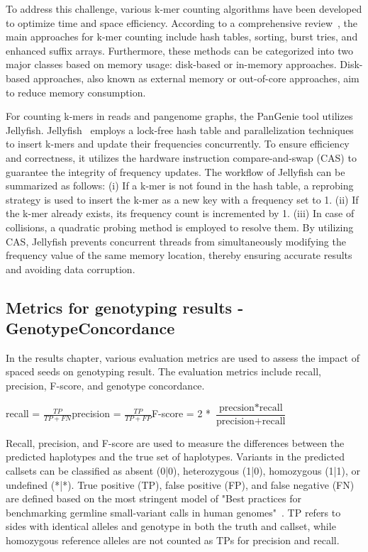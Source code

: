 \documentclass{PHlab-thesis}
\begin{document}
To address this challenge, various k-mer counting algorithms have been developed to optimize time and space efficiency. According to a comprehensive review~\cite{Man2018benchmark}, the main approaches for k-mer counting include hash tables, sorting, burst tries, and enhanced suffix arrays. Furthermore, these methods can be categorized into two major classes based on memory usage: disk-based or in-memory approaches. Disk-based approaches, also known as external memory or out-of-core approaches, aim to reduce memory consumption.

For counting k-mers in reads and pangenome graphs, the PanGenie tool utilizes Jellyfish. Jellyfish~\cite{Mar2011Jellyfish} employs a lock-free hash table and parallelization techniques to insert k-mers and update their frequencies concurrently. To ensure efficiency and correctness, it utilizes the hardware instruction compare-and-swap (CAS) to guarantee the integrity of frequency updates. The workflow of Jellyfish can be summarized as follows: (i) If a k-mer is not found in the hash table, a reprobing strategy is used to insert the k-mer as a new key with a frequency set to 1. (ii) If the k-mer already exists, its frequency count is incremented by 1. (iii) In case of collisions, a quadratic probing method is employed to resolve them. By utilizing CAS, Jellyfish prevents concurrent threads from simultaneously modifying the frequency value of the same memory location, thereby ensuring accurate results and avoiding data corruption.
\subsection{Metrics for genotyping results - GenotypeConcordance}
In the results chapter, various evaluation metrics are used to assess the impact of spaced seeds on genotyping result. The evaluation metrics include recall, precision, F-score, and genotype concordance.
\begin{center}
    recall = $\frac{TP}{TP + FN}$\hspace{0.5cm}precision = $\frac{TP}{TP + FP}$\hspace{0.5cm}F-score = 2 * $\dfrac{\text{precsion}*\text{recall}}{\text{precision} + \text{recall}}$
\end{center}

Recall, precision, and F-score are used to measure the differences between the predicted haplotypes and the true set of haplotypes. Variants in the predicted callsets can be classified as absent (0|0), heterozygous (1|0), homozygous (1|1), or undefined (*|*). True positive (TP), false positive (FP), and false negative (FN) are defined based on the most stringent model of "Best practices for benchmarking germline small-variant calls in human genomes"~\cite{Peter2019Metrics}. TP refers to sides with identical alleles and genotype in both the truth and callset, while homozygous reference alleles are not counted as TPs for precision and recall.
\end{document}
